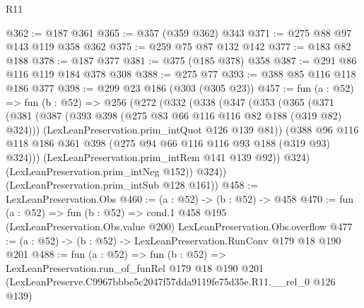 \begin{lexlean}{R11}
\begin{coremodule}
@362 := @187 @361
@365 := @357 (@359 @362) @343
@371 := @275 @88 @97 @143 @119 @358 @362
@375 := @259 @75 @87 @132 @142
@377 := @183 @82 @188
@378 := @187 @377
@381 := @375 (@185 @378) @358
@387 := @291 @86 @116 @119 @184 @378 @308
@388 := @275 @77
@393 := @388 @85 @116 @118 @186 @377
@398 := @299 @23 @186 (@303 (@305 @23))
@457 := fun (a : @52) =>
  fun (b : @52) =>
  @256
    (@272
      (@332
        (@338
          (@347
            (@353
              (@365
                (@371
                  (@381
                    (@387 (@393 @398 (@275 @83 @66 @116 @116 @82 @188 (@319 @82) @324)))
                    (LexLeanPreservation.prim_intQuot @126 @139 @81))
                  (@388
                    @96
                    @116
                    @118
                    @186
                    @361
                    @398
                    (@275 @94 @66 @116 @116 @93 @188 (@319 @93) @324)))
                (LexLeanPreservation.prim_intRem @141 @139 @92))
              @324)
            (LexLeanPreservation.prim_intNeg @152))
          @324))
      (LexLeanPreservation.prim_intSub @128 @161))
@458 := LexLeanPreservation.Obs
@460 := (a : @52) -> (b : @52) -> @458
@470 := fun (a : @52) =>
  fun (b : @52) =>
  cond.{1} @458 @195 (LexLeanPreservation.Obs.value @200) LexLeanPreservation.Obs.overflow
@477 := (a : @52) -> (b : @52) -> LexLeanPreservation.RunConv @179 @18 @190 @201
@488 := fun (a : @52) =>
  fun (b : @52) =>
  LexLeanPreservation.run_of_funRel
    @179
    @18
    @190
    @201
    (LexLeanPreserve.C9967bbbe5c2047f57dda9119fe75d35e.R11.__rel_0 @126 @139)
\end{coremodule}
\end{lexlean}
